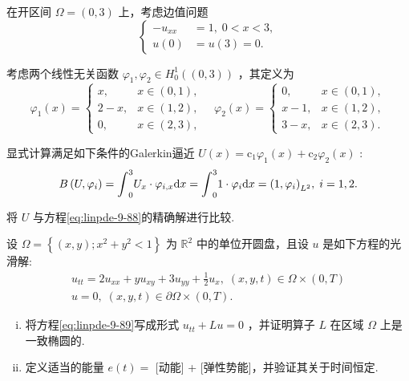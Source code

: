 \begin{rbhw}
在开区间 $\Omega  = ( 0,3)$ 上，考虑边值问题
\begin{equation}\tag{9.88}\label{eq:linpde-9-88}
\begin{cases}  - {u}_{xx} &  = 1,\;0 < x < 3, \\  u\left( 0\right) &  = u\left( 3\right)  = 0. \end{cases}
\end{equation}

考虑两个线性无关函数 ${\varphi }_{1},{\varphi }_{2} \in  {H}_{0}^{1}\left( {( 0,3) }\right)$ ，其定义为
\[
{\varphi }_{1}\left( x\right)  = \begin{cases} x, &x \in  \left(  {0,1}\right)  , \\  2 - x, &x \in  \left(  {1,2}\right)  , \\  0, &x \in  \left(  {2,3}\right)  , \end{cases} \quad {\varphi }_{2}\left( x\right)  = \begin{cases} 0, &x \in  \left(  {0,1}\right)  , \\  x - 1, &x \in  \left(  {1,2}\right)  , \\  3 - x, &x \in  \left(  {2,3}\right)  . \end{cases}
\]

显式计算满足如下条件的Galerkin逼近 $U\left( x\right)  = {\mathrm{c}}_{1}{\varphi }_{1}\left( x\right)  + {\mathrm{c}}_{2}{\varphi }_{2}\left( x\right)$ :
\[
B\left(  {U,{\varphi }_{i}}\right)   = {\int }_{0}^{3}{U}_{x} \cdot  {\varphi }_{i,x}{\mathop{}\!\mathrm{d} x} = {\int }_{0}^{3}1 \cdot  {\varphi }_{i}{\mathop{}\!\mathrm{d} x} = {\left( 1,{\varphi }_{i}\right) }_{{L}^{2}},\;i = 1,2.
\]

将 $U$ 与方程\eqref{eq:linpde-9-88}的精确解进行比较.

\end{rbhw}

\begin{rbhw}
设 $\Omega  = \left\{  {\left( {x,y}\right) ;{x}^{2} + {y}^{2} < 1}\right\}$ 为 ${\mathbb{R}}^{2}$ 中的单位开圆盘，且设 $u$ 是如下方程的光滑解:
\begin{equation}\tag{9.89}\label{eq:linpde-9-89}
    \begin{gathered}
        {u}_{tt} = 2{u}_{xx} + y{u}_{xy} + 3{u}_{yy} + \frac{1}{2}{u}_{x},\;(x,y,t)\in\Omega  \times  \left(  {0,T}\right) \\
        u = 0,\;(x,y,t)\in\partial \Omega  \times  \left(  {0,T}\right).
    \end{gathered}
\end{equation}
\begin{enumerate}[(i)]
    \item 将方程\eqref{eq:linpde-9-89}写成形式 ${u}_{tt} + {Lu} = 0$ ，并证明算子 $L$ 在区域 $\Omega$ 上是一致椭圆的.
    \item 定义适当的能量 $e\left( t\right)  =$ [动能] + [弹性势能]，并验证其关于时间恒定.
\end{enumerate}
\end{rbhw}

